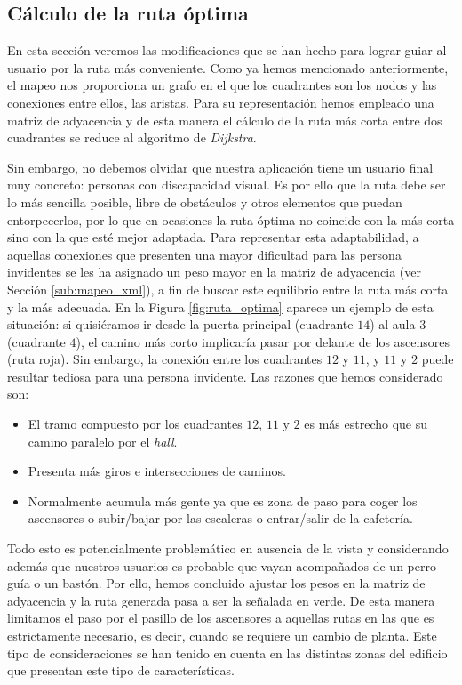 \subsection{Cálculo de la ruta óptima}
\label{sub:rutaOptima}

En esta sección veremos las modificaciones que se han hecho para lograr guiar al usuario por la ruta más conveniente. Como ya hemos mencionado anteriormente, el mapeo nos proporciona un grafo en el que los cuadrantes son los nodos y las conexiones entre ellos, las aristas. Para su representación hemos empleado una matriz de adyacencia y de esta manera el cálculo de la ruta más corta entre dos cuadrantes se reduce al algoritmo de \textit{Dijkstra}.

Sin embargo, no debemos olvidar que nuestra aplicación tiene un usuario final muy concreto: personas con discapacidad visual. Es por ello que la ruta debe ser lo más sencilla posible, libre de obstáculos y otros elementos que puedan entorpecerlos, por lo que en ocasiones la ruta óptima no coincide con la más corta sino con la que esté mejor adaptada. Para representar esta adaptabilidad, a aquellas conexiones que presenten una mayor dificultad para las persona invidentes se les ha asignado un peso mayor en la matriz de adyacencia (ver Sección \ref{sub:mapeo_xml}), a fin de buscar este equilibrio entre la ruta más corta y la más adecuada. En la Figura \ref{fig:ruta_optima} aparece un ejemplo de esta situación: si quisiéramos ir desde la puerta principal (cuadrante $14$) al aula 3 (cuadrante $4$), el camino más corto implicaría pasar por delante de los ascensores (ruta roja). Sin embargo, la conexión entre los cuadrantes $12$ y $11$, y $11$ y $2$ puede resultar tediosa para una persona invidente. Las razones que hemos considerado son: 
\begin{itemize}
	\item El tramo compuesto por los cuadrantes $12$, $11$ y $2$ es más estrecho que su camino paralelo por el \textit{hall}.
	\item Presenta más giros e intersecciones de caminos.
	\item Normalmente acumula más gente ya que es zona de paso para coger los ascensores o subir/bajar por las escaleras o entrar/salir de la cafetería.
\end{itemize} 
 	Todo esto es potencialmente problemático en ausencia de la vista y considerando además que nuestros usuarios es probable que vayan acompañados de un perro guía o un bastón. Por ello, hemos concluido ajustar los pesos en la matriz de adyacencia y la ruta generada pasa a ser la señalada en verde. De esta manera limitamos el paso por el pasillo de los ascensores a aquellas rutas en las que es estrictamente necesario, es decir, cuando se requiere un cambio de planta. Este tipo de consideraciones se han tenido en cuenta en las distintas zonas del edificio que presentan este tipo de características.


